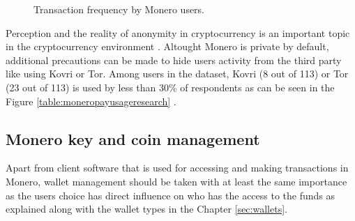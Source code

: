 \documentclass[
  printed, %
  table,   %
  nolof,     %
  nolot,     %
           oneside, color
]{fithesis3}
\begin{document}
\begin{center}
\begin{figure}[H]
\caption{Transaction frequency by Monero users.}
\label{chart:price}\end{figure}\end{center}

Perception and the reality of anonymity in cryptocurrency is an important topic in the cryptocurrency environment \cite{amarasinghe2019survey}. Altought Monero is private by default, additional precautions can be made to hide users activity from the third party like using Kovri or Tor. Among users in the dataset, Kovri (8 out of 113) or Tor (23 out of 113) is used by less than 30\% of respondents as can be seen in the Figure \ref{table:moneropayusageresearch} .

\subsection{Monero key and coin management}
Apart from client software that is used for accessing and making transactions in Monero, wallet management should be taken with at least the same importance as the users choice has direct influence on who has the access to the funds as explained along with the wallet types in the Chapter \ref{sec:wallets}.
\end{document}

